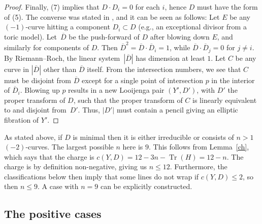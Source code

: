 \documentclass[10pt,a4paper]{amsart}
\numberwithin{equation}{section}
\numberwithin{figure}{section}
\numberwithin{table}{section}
\DeclareMathOperator{\Tr}{Tr}
\let\?=\overline
\theoremstyle{definition}
\begin{document}
\begin{proof}
Finally, (7) implies that $D\cdot D_i=0$ for each $i$, hence $D$ must have the form of (5). The converse was stated in \cite[Section~0.5.2, arXiv v1]{GHK1}, and it can be seen as follows: Let $E$ be any $(-1)$-curve hitting a component $D_i\subset D$ (e.g., an exceptional divisor from a toric model). Let~$\?{D}$ be the push-forward of $D$ after blowing down $E$, and similarly for components of $D$. Then $\?{D}^2=\?{D}\cdot \?{D}_i=1$, while $\?{D}\cdot \?{D}_j=0$ for $j\neq i$. By Riemann--Roch, the linear system~$|\?{D}|$ has dimension at least $1$. Let $C$ be any curve in $|\?{D}|$ other than $\?{D}$ itself. From the intersection numbers, we see that $C$ must be disjoint from $\?{D}$ except for a single point of intersection $p$ in the interior of $\?{D}_i$. Blowing up $p$ results in a new Looijenga pair $(Y',D')$, with $D'$ the proper transform of $D$, such that the proper transform of $C$ is linearly equivalent to and disjoint from~$D'$. Thus, $|D'|$ must contain a pencil giving an elliptic fibration of $Y'$.
\end{proof}

As stated above, if $D$ is minimal then it is either irreducible or consists of $n>1$ $(-2)$-curves. The largest possible $n$ here is $9$. This follows from Lemma~\ref{ch}, which says that the charge is $c(Y,D)=12-3n-\Tr(H)=12-n$. The charge is by definition non-negative, giving us $n\leq 12$. Furthermore, the classifications below then imply that some lines do not wrap if $c(Y,D)\leq 2$, so then $n\leq 9$. A case with $n=9$ can be explicitly constructed.

\subsection{The positive cases}\label{PositiveCase}
\end{document}
